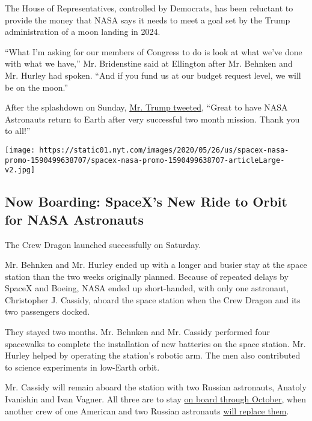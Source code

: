 The House of Representatives, controlled by Democrats, has been
reluctant to provide the money that NASA says it needs to meet a goal
set by the Trump administration of a moon landing in 2024.

``What I'm asking for our members of Congress to do is look at what
we've done with what we have,'' Mr. Bridenstine said at Ellington after
Mr. Behnken and Mr. Hurley had spoken. ``And if you fund us at our
budget request level, we will be on the moon.''

After the splashdown on Sunday,
\href{https://twitter.com/realDonaldTrump/status/1289997897723863040}{Mr.
Trump tweeted}, ``Great to have NASA Astronauts return to Earth after
very successful two month mission. Thank you to all!''

\href{https://www.nytimes.com/interactive/2020/05/26/science/spacex-nasa.html}{}

\texttt{[image: https://static01.nyt.com/images/2020/05/26/us/spacex-nasa-promo-1590499638707/spacex-nasa-promo-1590499638707-articleLarge-v2.jpg]}

\hypertarget{now-boarding-spacexs-new-ride-to-orbit-for-nasa-astronauts}{%
\subsection{Now Boarding: SpaceX's New Ride to Orbit for NASA
Astronauts}\label{now-boarding-spacexs-new-ride-to-orbit-for-nasa-astronauts}}

The Crew Dragon launched successfully on Saturday.

Mr. Behnken and Mr. Hurley ended up with a longer and busier stay at the
space station than the two weeks originally planned. Because of repeated
delays by SpaceX and Boeing, NASA ended up short-handed, with only one
astronaut, Christopher J. Cassidy, aboard the space station when the
Crew Dragon and its two passengers docked.

They stayed two months. Mr. Behnken and Mr. Cassidy performed four
spacewalks to complete the installation of new batteries on the space
station. Mr. Hurley helped by operating the station's robotic arm. The
men also contributed to science experiments in low-Earth orbit.

Mr. Cassidy will remain aboard the station with two Russian astronauts,
Anatoly Ivanishin and Ivan Vagner. All three are to stay
\href{https://www.nasa.gov/sites/default/files/atoms/files/exp-63-summary.pdf}{on
board through October}, when another crew of one American and two
Russian astronauts
\href{https://www.nasa.gov/press-release/nasa-astronaut-kate-rubins-crewmates-to-discuss-upcoming-spaceflight}{will
replace them}.


